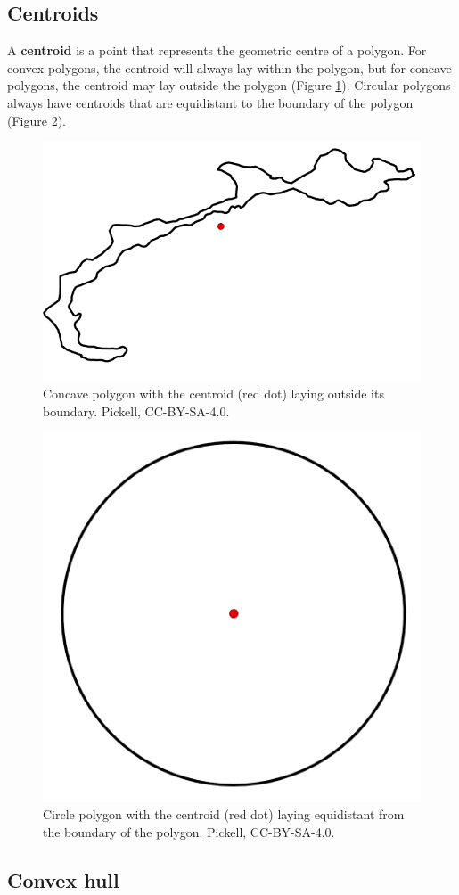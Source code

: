 \documentclass[
]{book}
\begin{document}
\hypertarget{centroids}{%
\subsection{Centroids}\label{centroids}}

A \textbf{centroid} is a point that represents the geometric centre of a polygon. For convex polygons, the centroid will always lay within the polygon, but for concave polygons, the centroid may lay outside the polygon (Figure \ref{fig:7-concave-polygon-centroid}). Circular polygons always have centroids that are equidistant to the boundary of the polygon (Figure \ref{fig:7-circle-polygon-centroid}).

\begin{figure}
\includegraphics[width=0.5\linewidth]{images/07-concave-polygon-centroid} \caption{Concave polygon with the centroid (red dot) laying outside its boundary. Pickell, CC-BY-SA-4.0.}\label{fig:7-concave-polygon-centroid}
\end{figure}

\begin{figure}
\includegraphics[width=0.5\linewidth]{images/07-circle-polygon-centroid} \caption{Circle polygon with the centroid (red dot) laying equidistant from the boundary of the polygon. Pickell, CC-BY-SA-4.0.}\label{fig:7-circle-polygon-centroid}
\end{figure}

\hypertarget{convex-hull}{%
\subsection{Convex hull}\label{convex-hull}}
\end{document}
